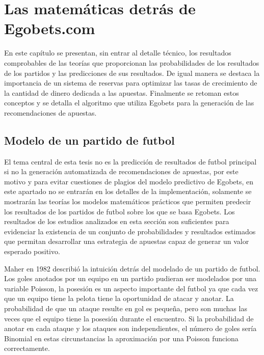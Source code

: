 \chapter{Las matemáticas detrás de Egobets.com}
\label{chap:mate}

En este capítulo se presentan, sin entrar al detalle técnico, los resultados comprobables de las teorías que proporcionan las probabilidades de los resultados de los partidos y las predicciones de sus resultados. De igual manera se destaca la importancia de un sistema de reservas para optimizar las tasas de crecimiento de la cantidad de dinero dedicada a las apuestas. Finalmente se retoman estos conceptos y se detalla el algoritmo que utiliza Egobets para la generación de las recomendaciones de apuestas.



\section{Modelo de un partido de futbol}
\label{sec:modelo}

El tema central de esta tesis no es la predicción de resultados de futbol principal si no la generación automatizada de recomendaciones de apuestas, por este motivo y para evitar cuestiones de plagios del modelo predictivo de Egobets, en este apartado no se entrarán en los detalles de la implementación, solamente se mostrarán las teorías los modelos matemáticos prácticos que permiten predecir los resultados de los partidos de futbol sobre los que se basa Egobets. Los resultados de los estudios analizados en esta sección son suficientes para evidenciar la existencia de un conjunto de probabilidades y resultados estimados que permitan desarrollar una estrategia de apuestas capaz de generar un valor esperado positivo.

Maher en 1982 \cite{maher1982modelling} describió la intuición detrás del modelado de un partido de futbol. Los goles anotados por un equipo en un partido pudieran ser modelados por una variable Poisson, la posesión es un aspecto importante del futbol ya que cada vez que un equipo tiene la pelota tiene la oportunidad de atacar y anotar. La probabilidad de que un ataque resulte en gol es pequeña, pero son muchas las veces que el equipo tiene la posesión durante el encuentro. Si la probabilidad de anotar en cada ataque y los ataques son independientes, el número de goles sería Binomial en estas circunstancias la aproximación por una Poisson funciona correctamente.

